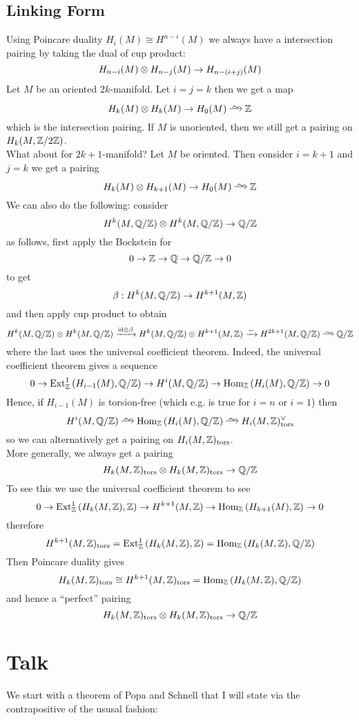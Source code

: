 \documentclass[12pt]{article}
\begin{document}
\subsection{Linking Form}

Using Poincare duality $H_i(M) \cong H^{n-i}(M)$ we always have a intersection pairing by taking the dual of cup product:
\[ H_{n-i}(M) \otimes H_{n-j}(M) \to H_{n-(i+j)}(M) \]
Let $M$ be an oriented $2k$-manifold. Let $i = j = k$ then we get a map
\[ H_{k}(M) \ot H_{k}(M) \to H_0(M) \iso \Z \]
which is the intersection pairing. If $M$ is unoriented, then we still get a pairing on $H_k(M, \mathbb{Z}/2\mathbb{Z})$.  
\bigskip\\
What about for $2k+1$-manifold? Let $M$ be oriented. Then consider $i = k + 1$ and $j = k$ we get a pairing
\[ H_k(M) \ot H_{k+1}(M) \to H_0(M) \iso \Z \]
We can also do the following: consider 
\[ H^k(M, \mathbb{Q} / \mathbb{Z}) \otimes H^k(M, \mathbb{Q} / \mathbb{Z}) \to \mathbb{Q} / \mathbb{Z} \]
as follows, first apply the Bockstein for 
\[ 0 \to \mathbb{Z} \to \mathbb{Q} \to \mathbb{Q} / \mathbb{Z} \to 0 \]
to get
\[ \beta : H^k(M, \mathbb{Q}/ \mathbb{Z}) \to H^{k+1}(M, \mathbb{Z}) \]
and then apply cup product to obtain
\[ H^k(M, \Q / \Z) \ot H^k(M, \Q / \Z) \xrightarrow{\id \ot \beta} H^k(M, \Q / \Z) \ot H^{k+1}(M, \Z) \xrightarrow{\smile} H^{2k+1}(M, \Q / \Z) \iso \Q / \Z \]
where the last uses the universal coefficient theorem. Indeed, the universal coefficient theorem gives a sequence
\[ 0 \to \mathrm{Ext}^{1}_{\mathbb{Z}} \left( H_{i-1}(M), \mathbb{Q}/\mathbb{Z} \right) \to H^{i}(M, \mathbb{Q}/\mathbb{Z}) \to \mathrm{Hom}_{\mathbb{Z}} \left( H_i(M), \mathbb{Q}/\mathbb{Z} \right) \to 0 \]
Hence, if $H_{i-1}(M)$ is torsion-free (which e.g. is true for $i = n$ or $i = 1$) then
\[ H^i(M, \Q/\Z) \iso \Hom{\Z}{H_i(M)}{\Q/\Z} \iso H_i(M,\Z)_{\tors}^\vee \]
so we can alternatively get a pairing on $H_i(M, \mathbb{Z})_{\mathrm{tors}}$. 
\bigskip\\
More generally, we always get a pairing
\[ H_k(M,\mathbb{Z})_{\mathrm{tors}} \otimes H_k(M, \mathbb{Z})_{\mathrm{tors}} \to \mathbb{Q} / \mathbb{Z} \]
To see this we use the universal coefficient theorem to see
\[ 0 \to \mathrm{Ext}^{1}_{\mathbb{Z}} \left( H_{k}(M, \mathbb{Z}), \mathbb{Z} \right) \to H^{k+1}(M, \mathbb{Z}) \to \mathrm{Hom}_{\mathbb{Z}} \left( H_{k+1}(M), \mathbb{Z} \right) \to 0 \] 
therefore
\[ H^{k+1}(M, \mathbb{Z})_{\mathrm{tors}} = \mathrm{Ext}^{1}_{\mathbb{Z}} \left( H_{k}(M, \mathbb{Z}), \mathbb{Z} \right) = \mathrm{Hom}_{\mathbb{Z}} \left( H_{k}(M, \mathbb{Z}), \mathbb{Q}/\mathbb{Z} \right) \]
Then Poincare duality gives
\[ H_k(M, \mathbb{Z})_{\mathrm{tors}} \cong H^{k+1}(M, \mathbb{Z})_{\mathrm{tors}} = \mathrm{Hom}_{\mathbb{Z}} \left( H_{k}(M, \mathbb{Z}), \mathbb{Q}/\mathbb{Z} \right) \]
and hence a ``perfect'' pairing
\[ H_k(M, \mathbb{Z})_{\mathrm{tors}} \otimes H_k(M, \mathbb{Z})_{\mathrm{tors}} \to \mathbb{Q} / \mathbb{Z} \]

\section{Talk}

We start with a theorem of Popa and Schnell that I will state via the contrapositive of the ususal fashion:
\end{document}
